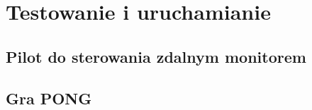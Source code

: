 \section{Testowanie i uruchamianie}

\subsection{Pilot do sterowania zdalnym monitorem}

\subsection{Gra PONG}
